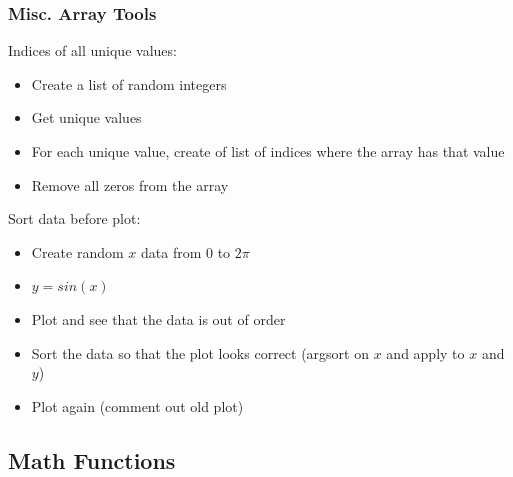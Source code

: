 \documentclass{beamer}
\begin{document}
\begin{frame}	
	\frametitle{Misc. Array Tools}
	
	\begin{exampleblock}{Indices of all unique values:}
		\footnotesize
		\begin{itemize}
			\footnotesize
			\item Create a list of random integers
			\item Get unique values
			\item For each unique value, create of list of indices where the array has that value
			\item Remove all zeros from the array
		\end{itemize}
	\end{exampleblock}
	
	\begin{exampleblock}{Sort data before plot:}
		\footnotesize
		\begin{itemize}
			\footnotesize
			\item Create random $x$ data from 0 to $2\pi$
			\item $y = sin(x)$
			\item Plot and see that the data is out of order
			\item Sort the data so that the plot looks correct (argsort on $x$ and apply to $x$ and $y$)
			\item Plot again (comment out old plot)
		\end{itemize}
	\end{exampleblock}
	
\end{frame}

\subsection{Math Functions}
\end{document}
